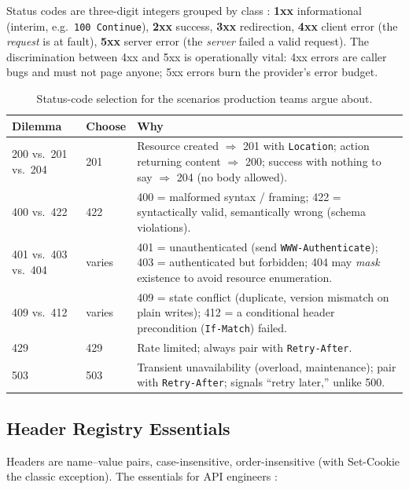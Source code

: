 Status codes are three-digit integers grouped by class \cite{rfc9110}: \textbf{1xx} informational (interim, e.g.\ \texttt{100 Continue}), \textbf{2xx} success, \textbf{3xx} redirection, \textbf{4xx} client error (the \emph{request} is at fault), \textbf{5xx} server error (the \emph{server} failed a valid request). The discrimination between 4xx and 5xx is operationally vital: 4xx errors are caller bugs and must not page anyone; 5xx errors burn the provider's error budget.

\begin{table}[h]
  \centering
  \small
  \begin{tabularx}{\textwidth}{l l X}
    \toprule
    \textbf{Dilemma} & \textbf{Choose} & \textbf{Why} \\
    \midrule
    200 vs.\ 201 vs.\ 204 & 201 & Resource created $\Rightarrow$ 201 with \texttt{Location}; action returning content $\Rightarrow$ 200; success with nothing to say $\Rightarrow$ 204 (no body allowed). \\
    400 vs.\ 422 & 422 & 400 = malformed syntax / framing; 422 = syntactically valid, semantically wrong (schema violations). \\
    401 vs.\ 403 vs.\ 404 & varies & 401 = unauthenticated (send \texttt{WWW-Authenticate}); 403 = authenticated but forbidden; 404 may \emph{mask} existence to avoid resource enumeration. \\
    409 vs.\ 412 & varies & 409 = state conflict (duplicate, version mismatch on plain writes); 412 = a conditional header precondition (\texttt{If-Match}) failed. \\
    429 & 429 & Rate limited; always pair with \texttt{Retry-After}. \\
    503 & 503 & Transient unavailability (overload, maintenance); pair with \texttt{Retry-After}; signals ``retry later,'' unlike 500. \\
    \bottomrule
  \end{tabularx}
  \caption{Status-code selection for the scenarios production teams argue about.}
  \label{tab:statusdilemmas}
\end{table}

\subsection{Header Registry Essentials}

Headers are name--value pairs, case-insensitive, order-insensitive (with Set-Cookie the classic exception). The essentials for API engineers \cite{rfc9110}:

